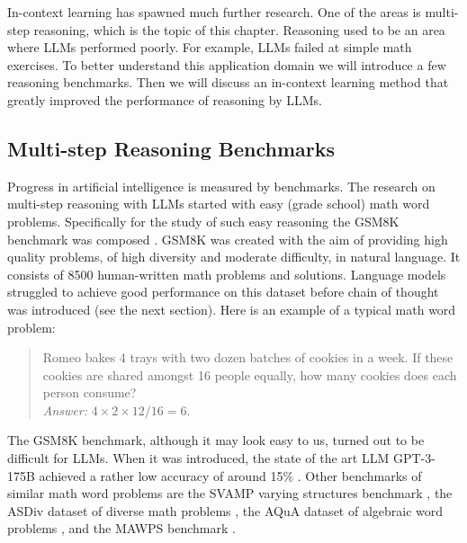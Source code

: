 In-context learning has spawned much further research. One of the areas is multi-step reasoning, which is the topic of this chapter. Reasoning used to be an area where LLMs performed poorly. For example, LLMs failed at simple math exercises. To better understand this application domain we will introduce a few reasoning benchmarks. Then we will discuss an in-context learning method that greatly improved the performance of  reasoning by LLMs.

\subsection{Multi-step Reasoning Benchmarks}\label{sec:benchmarks}
Progress in artificial intelligence is measured by benchmarks. 
The research on multi-step reasoning with LLMs started with easy 
(grade school)
math word problems. Specifically  for the study of such easy reasoning the GSM8K benchmark  was composed \citep{cobbe2021training}.
GSM8K was created   with the aim of providing high quality problems, of high
diversity and moderate difficulty,  in natural language. It consists of 8500 human-written math
problems and solutions. Language models struggled to achieve good performance on this dataset before chain of thought was introduced (see the %
next section).
Here is an example of a typical math word problem: 
\begin{quotation}
  Romeo bakes 4 trays with 
two dozen batches of cookies in a week. If these cookies are shared amongst 16 people equally, how many cookies does
each person consume?\\ 
{\em Answer:} $4\times 2\times 12/16=6$. 
\end{quotation}

The GSM8K benchmark, although it may look easy to us, turned out to be difficult for LLMs. When it was introduced, the state of the art  LLM GPT-3-175B achieved a rather low accuracy of around 15\% \citep{wei2022chain}.
Other  benchmarks of similar math word problems are the SVAMP varying structures benchmark \citep{patel2021nlp}, the
ASDiv dataset of diverse math problems \citep{miao2021diverse}, the AQuA dataset of algebraic
word problems \citep{ling2017program}, and the MAWPS benchmark
\citep{koncel2016mawps}. 


